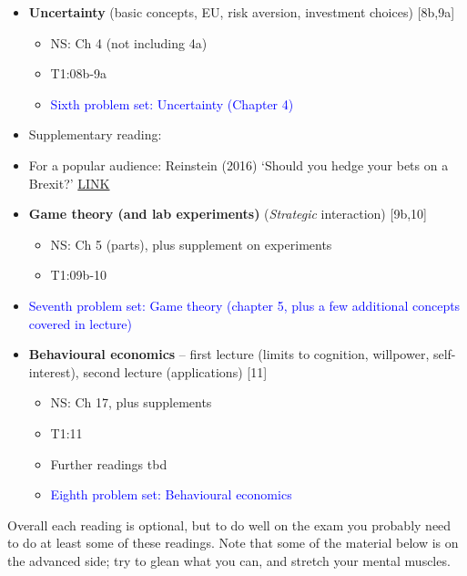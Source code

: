 \documentclass[]{article}
\providecommand{\tightlist}{%
  \setlength{\itemsep}{0pt}\setlength{\parskip}{0pt}}
\begin{document}
\begin{itemize}
\item
  \textbf{Uncertainty} (basic concepts, EU, risk aversion, investment choices) {[}8b,9a{]}

  \begin{itemize}
  \item
    NS: Ch 4 (not including 4a)
  \item
    T1:08b-9a
  \item
    \textcolor{blue}{Sixth problem set: Uncertainty (Chapter 4)}
  \end{itemize}
\item
  Supplementary reading:
\item
  For a popular audience: Reinstein (2016) `Should you hedge your bets on a Brexit?' \href{https://davidreinstein.wordpress.com/2016/06/19/should-you-hedge-your-bets-on-a-brexit/}{LINK}
\item
  \textbf{Game theory (and lab experiments)} (\emph{Strategic} interaction) {[}9b,10{]}

  \begin{itemize}
  \tightlist
  \item
    NS: Ch 5 (parts), plus supplement on experiments
  \item
    T1:09b-10
  \end{itemize}
\item
  \textcolor{blue}{Seventh problem set: Game theory (chapter 5, plus a few additional concepts covered in lecture)}
\item
  \textbf{Behavioural economics} -- first lecture (limits to cognition, willpower, self-interest), second lecture (applications) {[}11{]}

  \begin{itemize}
  \tightlist
  \item
    NS: Ch 17, plus supplements
  \item
    T1:11
  \item
    Further readings tbd
  \item
    \textcolor{blue}{Eighth problem set: Behavioural economics}
  \end{itemize}
\end{itemize}

Overall each reading is optional, but to do well on the exam you probably need to do at least some of these readings. Note that some of the material below is on the advanced side; try to glean what you can, and stretch your mental muscles.
\end{document}
